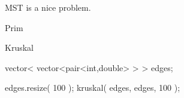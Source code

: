 
MST is a nice problem.

\begin{algorithm}{Prim}
\end{algorithm}

\begin{algorithm}{Kruskal}
\begin{example}
	vector< vector<pair<int,double> > > edges;

	edges.resize( 100 );
	kruskal( edges, edges, 100 );
\end{example}
\end{algorithm}

\begin{sourceslandscape}
\end{sourceslandscape}

